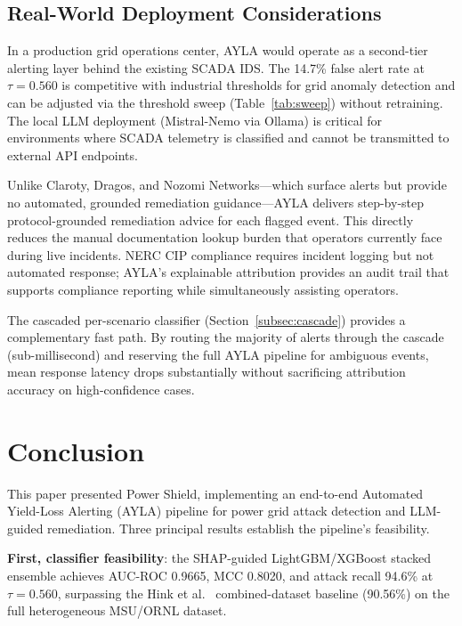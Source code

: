 \documentclass[twocolumn, 10pt, letterpaper]{article}
\begin{document}
\subsection{Real-World Deployment Considerations}

In a production grid operations center, AYLA would operate as a second-tier
alerting layer behind the existing SCADA IDS.
The 14.7\% false alert rate at $\tau{=}0.560$ is competitive with industrial
thresholds for grid anomaly detection and can be adjusted via the threshold
sweep (Table~\ref{tab:sweep}) without retraining.
The local LLM deployment (Mistral-Nemo via Ollama) is critical for environments
where SCADA telemetry is classified and cannot be transmitted to external API endpoints.

Unlike Claroty, Dragos, and Nozomi Networks---which surface alerts but provide
no automated, grounded remediation guidance---AYLA delivers step-by-step
protocol-grounded remediation advice for each flagged event.
This directly reduces the manual documentation lookup burden that operators
currently face during live incidents.
NERC CIP compliance requires incident logging but not automated response;
AYLA's explainable attribution provides an audit trail that supports compliance
reporting while simultaneously assisting operators.

The cascaded per-scenario classifier (Section~\ref{subsec:cascade}) provides a
complementary fast path.
By routing the majority of alerts through the cascade (sub-millisecond) and
reserving the full AYLA pipeline for ambiguous events, mean response latency
drops substantially without sacrificing attribution accuracy on high-confidence
cases.

\section{Conclusion}
\label{sec:conclusion}

This paper presented Power Shield, implementing an end-to-end
Automated Yield-Loss Alerting (AYLA) pipeline for power grid attack detection
and LLM-guided remediation.
Three principal results establish the pipeline's feasibility.

\textbf{First, classifier feasibility}: the SHAP-guided LightGBM/XGBoost stacked
ensemble achieves AUC-ROC 0.9665, MCC 0.8020, and attack recall 94.6\% at
$\tau{=}0.560$, surpassing the Hink et al.\ \cite{hink2014ml} combined-dataset
baseline (90.56\%) on the full heterogeneous MSU/ORNL dataset.
\end{document}

